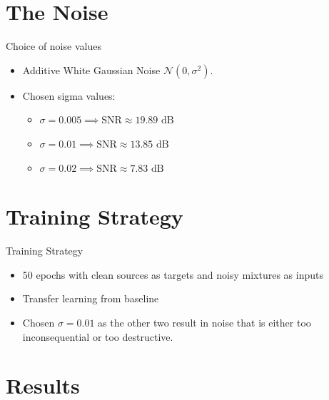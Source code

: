\documentclass{beamer}
\begin{document}
\section{The Noise} 
\begin{frame}{Choice of noise values}
    \begin{itemize}
        \item Additive White Gaussian Noise $\mathcal{N}(0, \sigma^2)$.
        \item Chosen sigma values:
        \begin{itemize}
            \item $\sigma = 0.005 \implies \text{SNR} \approx 19.89 \text{ dB}$
            \item $\sigma = 0.01 \implies \text{SNR} \approx 13.85 \text{ dB}$
            \item $\sigma = 0.02 \implies \text{SNR} \approx 7.83 \text{ dB}$
        \end{itemize}
    \end{itemize}
\end{frame}

\section{Training Strategy}
\begin{frame}{Training Strategy}
    \begin{itemize}
        \item 50 epochs with clean sources as targets
        and noisy mixtures as inputs
        \item Transfer learning from baseline
        \item Chosen $\sigma = 0.01$ as the other two result in noise that is
        either too inconsequential or too destructive. 
    \end{itemize}
\end{frame}

\section{Results}
\end{document}
